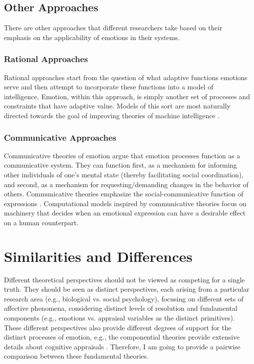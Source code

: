 \documentclass[11pt]{article}
\begin{document}
\subsection{Other Approaches}

There are other approaches that different researchers take based on their
emphasis on the applicability of emotions in their systems.

\subsubsection{Rational Approaches}

Rational approaches start from the question of what adaptive functions emotions
serve and then attempt to incorporate these functions into a model of
intelligence. Emotion, within this approach, is simply another set of processes
and constraints that have adaptive value. Models of this sort are most naturally
directed towards the goal of improving theories of machine intelligence
\cite{anderson:newell-cognition} \cite{scheutz:affect-agent}
\cite{simon:motivation-emotion-cognition}.

\subsubsection{Communicative Approaches}

Communicative theories of emotion argue that emotion processes function as a
communicative system. They can function first, as a mechanism for informing
other individuals of one’s mental state (thereby facilitating social
coordination), and second, as a mechanism for requesting/demanding changes in
the behavior of others. Communicative theories emphasize the
social-communicative function of expressions \cite{gratch:emotion-intention}.
Computational models inspired by communicative theories focus on machinery that
decides when an emotional expression can have a desirable effect on a human
counterpart.

\section{Similarities and Differences}
\label{sec:comparison}

Different theoretical perspectives should not be viewed as competing for a
single truth. They should be seen as distinct perspectives, each arising from a
particular research area (e.g., biological vs. social psychology), focusing on
different sets of affective phenomena, considering distinct levels of resolution
and fundamental components (e.g., emotions vs. appraisal variables as the
distinct primitives). These different perspectives also provide different
degrees of support for the distinct processes of emotion, e.g., the componential
theories provide extensive details about cognitive appraisals
\cite{hudlicka:guidelines-emotions}. Therefore, I am going to provide a pairwise
comparison between these fundamental theories.
\end{document}
